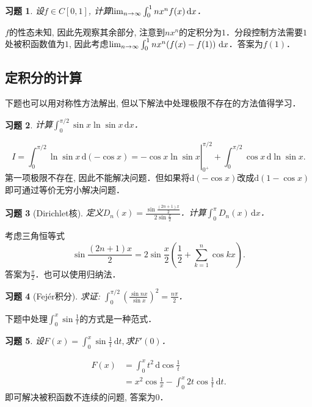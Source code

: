 \documentclass[11pt,a4paper]{ctexart}
\makeatletter
\theoremstyle{thmseries} %
\theoremstyle{exerseries}
\newtheorem{exer}{习题}[section]
\renewenvironment{proof}[1][\proofname]{\par
  \pushQED{\qed}%
  \normalfont \topsep6\p@\@plus6\p@\relax
  \trivlist
  \item[\hskip\labelsep
        \itshape
    #1\@addpunct{}]\ignorespaces
}{%
  \popQED\endtrivlist\@endpefalse
}
\newenvironment{sol}{\begin{proof}[\bfseries\upshape 解\quad]}{\end{proof}}
\newcommand{\bra}[1]{\mathopen{}\left(#1\right)}
\renewcommand{\d}{\mathrm{d}}
\def \nti {\mathnormal{n}\to\infty}
\makeatother
\begin{document}
\begin{exer}
	设$f\in C[0,1]$, 计算$\lim_{\nti}\int_{0}^{1}nx^nf(x)\,\d x$．
\end{exer}
\begin{sol}
	$f$的性态未知, 因此先观察其余部分, 注意到$nx^n$的定积分为$1$．分段控制方法需要$1$处被积函数值为$1$, 因此考虑$\lim_{\nti}\int_{0}^{1}nx^n\bra{f(x)-f(1)}\,\d x$．答案为$f(1)$．
\end{sol}


\subsection{定积分的计算}
下题也可以用对称性方法解出, 但以下解法中处理极限不存在的方法值得学习．
\begin{exer}
	计算$\int_{0}^{\pi/2}\sin x\ln\sin x\,\d x$．
\end{exer}
\begin{sol}
	\[\left.I=\int_{0}^{\pi/2}\ln\sin x\,\d(-\cos x)=-\cos x\ln\sin x\right|_{0^+}^{\pi/2}+\int_{0}^{\pi/2}\cos x\,\d\ln\sin x.\]
	第一项极限不存在, 因此不能解决问题．但如果将$\d(-\cos x)$改成$\d(1-\cos x)$即可通过等价无穷小解决问题．
\end{sol}

\begin{exer}[Dirichlet核]
	定义$D_n(x)=\frac{\sin\frac{(2n+1)x}{2}}{2\sin\frac{x}{2}}$．计算$\int_{0}^{\pi}D_n(x)\,\d x$．
\end{exer}
\begin{sol}
	考虑三角恒等式
	\[\sin\frac{(2n+1)x}{2}=2\sin\frac{x}{2}\bra{\frac{1}{2}+\sum_{k=1}^{n}\cos kx}.\]
	答案为$\frac{\pi}{2}$．也可以使用归纳法．
\end{sol}

\begin{exer}[Fejér积分]
	求证: $\int_{0}^{\pi/2}\bra{\frac{\sin nx}{\sin x}}^2=\frac{n\pi}{2}$．
\end{exer}

下题中处理$\int_{0}^{x}\sin\frac{1}{t}$的方式是一种范式．
\begin{exer}
	设$F(x)=\int_{0}^{x}\sin\frac{1}{t}\,\d t,$求$F'(0)$．
\end{exer}
\begin{sol}
	\begin{align*}
		F(x)&=\int_{0}^{x}t^2\,\d\cos\frac{1}{t}\\
		&=x^2\cos\frac{1}{x}-\int_{0}^{x}2t\cos\frac{1}{t}\,\d t.
	\end{align*}
	即可解决被积函数不连续的问题, 答案为$0$．
\end{sol}
\end{document}
